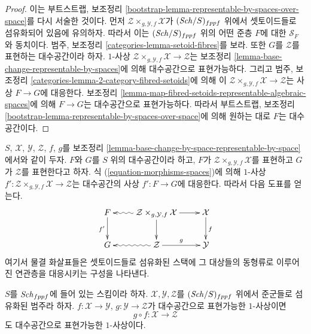 \begin{proof}
이는 부트스트랩, 보조정리
\ref{bootstrap-lemma-representable-by-spaces-over-space}를 다시 서술한
것이다. 먼저
$\mathcal{Z} \times_{g, \mathcal{Y}, f} \mathcal{X}$가
$(\mathit{Sch}/S)_{fppf}$ 위에서 셋토이드들로 섬유화되어 있음에 유의하자.
따라서 이는 $(\mathit{Sch}/S)_{fppf}$ 위의 어떤 준층 $F$에 대한
$\mathcal{S}_F$와 동치이다. 범주, 보조정리
\ref{categories-lemma-setoid-fibres}를 보라. 또한 $G$를 $\mathcal{Z}$를
표현하는 대수공간이라 하자. $1$-사상
$\mathcal{Z} \times_{g, \mathcal{Y}, f} \mathcal{X} \to \mathcal{Z}$는
보조정리 \ref{lemma-base-change-representable-by-spaces}에 의해
대수공간으로 표현가능하다. 그리고 범주, 보조정리
\ref{categories-lemma-2-category-fibred-setoids}에 의해 이
$\mathcal{Z} \times_{g, \mathcal{Y}, f} \mathcal{X} \to \mathcal{Z}$는
사상 $F \to G$에 대응한다. 보조정리
\ref{lemma-map-fibred-setoids-representable-algebraic-spaces}에 의해
$F \to G$는 대수공간으로 표현가능하다. 따라서 부트스트랩, 보조정리
\ref{bootstrap-lemma-representable-by-spaces-over-space}에 의해 원하는
대로 $F$는 대수공간이다.
\end{proof}

\noindent
$S$, $\mathcal{X}$, $\mathcal{Y}$, $\mathcal{Z}$, $f$, $g$를 보조정리
\ref{lemma-base-change-by-space-representable-by-space}에서와 같이 두자.
$F$와 $G$를 $S$ 위의 대수공간이라 하고, $F$가
$\mathcal{Z} \times_{g, \mathcal{Y}, f} \mathcal{X}$를 표현하고
$G$가 $\mathcal{Z}$를 표현한다고 하자. 식
(\ref{equation-morphisms-spaces})에 의해 $1$-사상
$f' : \mathcal{Z} \times_{g, \mathcal{Y}, f} \mathcal{X} \to \mathcal{Z}$는
대수공간의 사상 $f' : F \to G$에 대응한다. 따라서 다음 도표를 얻는다.
\begin{equation}
\label{equation-representable-by-algebraic-spaces-on-space}
\vcenter{
\xymatrix{
F \ar[d]_{f'} &
\mathcal{Z} \times_{g, \mathcal{Y}, f} \mathcal{X}
\ar@{~>}[l] \ar[d] \ar[r] &
\mathcal{X} \ar[d]^f \\
G &
\mathcal{Z} \ar@{~>}[l] \ar[r]^-g &
\mathcal{Y}
}
}
\end{equation}
여기서 물결 화살표들은 셋토이드들로 섬유화된 스택에 그 대상들의 동형류로
이루어진 연관층을 대응시키는 구성을 나타낸다.

\begin{lemma}
\label{lemma-composition-representable-by-spaces}
$S$를 $\mathit{Sch}_{fppf}$에 들어 있는 스킴이라 하자.
$\mathcal{X}, \mathcal{Y}, \mathcal{Z}$를 $(\mathit{Sch}/S)_{fppf}$ 위에서
준군들로 섬유화된 범주라 하자. $f : \mathcal{X} \to \mathcal{Y}$,
$g : \mathcal{Y} \to \mathcal{Z}$가 대수공간으로 표현가능한
$1$-사상이면
$$
g \circ f : \mathcal{X} \longrightarrow \mathcal{Z}
$$
도 대수공간으로 표현가능한 $1$-사상이다.
\end{lemma}

